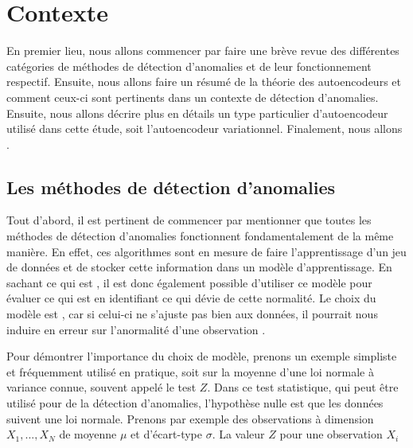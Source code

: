 \chapter{Contexte}     %
\label{chap:background}                   %

En premier lieu, nous allons commencer par faire une brève revue des différentes catégories  de méthodes de détection d'anomalies et de leur fonctionnement respectif. Ensuite, nous allons faire un résumé de la théorie des autoencodeurs et \DIFaddbegin {}\DIFaddend comment ceux-ci sont pertinents dans un contexte de détection d'anomalies. Ensuite, nous allons décrire plus en détails un type particulier d'autoencodeur utilisé dans cette étude, soit l'autoencodeur variationnel. Finalement, nous allons \DIFdelbegin {}\DIFdelend \DIFaddbegin {}\DIFaddend .

\section{Les méthodes de détection d'anomalies}

Tout d'abord, il est pertinent de commencer par mentionner que toutes les méthodes de détection d'anomalies fonctionnent fondamentalement de la même manière. En effet, ces algorithmes sont en mesure de faire l'apprentissage d'un jeu de données et de stocker cette information dans un modèle d'apprentissage. En sachant ce qui est \DIFdelbegin {}\DIFdelend \DIFaddbegin {}\DIFaddend , il est donc également possible d'utiliser ce modèle pour évaluer ce qui est \DIFdelbegin {}\DIFdelend \DIFaddbegin {}\DIFaddend en identifiant ce qui dévie de cette normalité. Le choix du modèle est \DIFdelbegin {}\DIFdelend \DIFaddbegin {}\DIFaddend , car si celui-ci ne s'ajuste pas bien aux données, il pourrait nous induire en erreur sur l'anormalité d'une observation \citep{10.5555/3086742}. 

Pour démontrer l'importance du choix de modèle, prenons un exemple simpliste et fréquemment utilisé en pratique, soit sur la moyenne d'une loi normale à variance connue, souvent appelé le test $Z$. Dans ce test statistique, qui peut être utilisé pour de la détection d'anomalies, l'hypothèse nulle est que les données suivent une loi normale. Prenons par exemple des observations à \DIFdelbegin {}\DIFdelend \DIFaddbegin {}\DIFaddend dimension $X_1, ..., X_N$ \DIFdelbegin {}\DIFdelend de moyenne $\mu$ et d'écart-type $\sigma$. La valeur $Z$ pour une observation $X_i$ \DIFdelbegin {}\DIFdelend \DIFaddbegin {}\DIFaddend 

